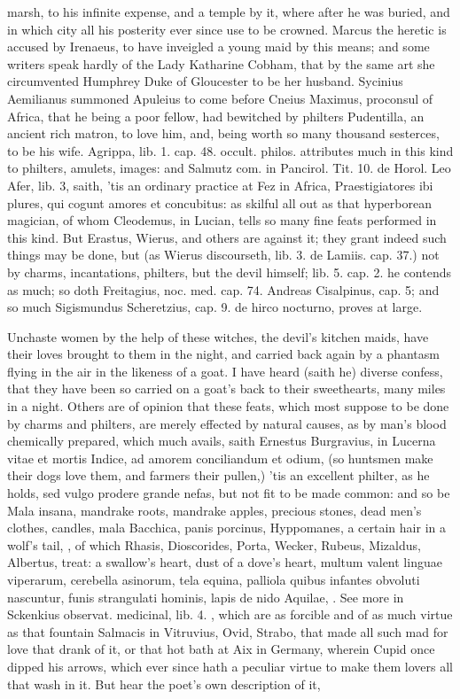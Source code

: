 {marsh, to his infinite expense, and a temple by it, where after
he was buried, and in which city all his posterity ever since use to be
crowned. Marcus the heretic is accused by Irenaeus, to have inveigled a
young maid by this means; and some writers speak hardly of the Lady
Katharine Cobham, that by the same art she circumvented Humphrey Duke
of Gloucester to be her husband. Sycinius Aemilianus summoned
Apuleius to come before Cneius Maximus, proconsul of Africa, that
he being a poor fellow, had bewitched by philters Pudentilla, an
ancient rich matron, to love him, and, being worth so many thousand
sesterces, to be his wife. Agrippa, lib. 1. cap. 48. occult. philos.
attributes much in this kind to philters, amulets, images: and Salmutz
com. in Pancirol. Tit. 10. de Horol. Leo Afer, lib. 3, saith, 'tis an
ordinary practice at Fez in Africa, Praestigiatores ibi plures, qui
cogunt amores et concubitus: as skilful all out as that hyperborean
magician, of whom Cleodemus, in  Lucian, tells so many fine feats
performed in this kind. But Erastus, Wierus, and others are against it;
they grant indeed such things may be done, but (as Wierus discourseth,
lib. 3. de Lamiis. cap. 37.) not by charms, incantations, philters, but
the devil himself; lib. 5. cap. 2. he contends as much; so doth
Freitagius, noc. med. cap. 74. Andreas Cisalpinus, cap. 5; and so much
Sigismundus Scheretzius, cap. 9. de hirco nocturno, proves at large.

Unchaste women by the help of these witches, the devil's kitchen
maids, have their loves brought to them in the night, and carried back
again by a phantasm flying in the air in the likeness of a goat. I have
heard (saith he) diverse confess, that they have been so carried on a
goat's back to their sweethearts, many miles in a night. Others are of
opinion that these feats, which most suppose to be done by charms and
philters, are merely effected by natural causes, as by man's blood
chemically prepared, which much avails, saith Ernestus Burgravius, in
Lucerna vitae et mortis Indice, ad amorem conciliandum et odium, (so
huntsmen make their dogs love them, and farmers their pullen,) 'tis an
excellent philter, as he holds, sed vulgo prodere grande nefas, but not
fit to be made common: and so be Mala insana, mandrake roots, mandrake
apples, precious stones, dead men's clothes, candles, mala
Bacchica, panis porcinus, Hyppomanes, a certain hair in a wolf's
tail, \etc{}, of which Rhasis, Dioscorides, Porta, Wecker, Rubeus,
Mizaldus, Albertus, treat: a swallow's heart, dust of a dove's heart,
multum valent linguae viperarum, cerebella asinorum, tela equina,
palliola quibus infantes obvoluti nascuntur, funis strangulati hominis,
lapis de nido Aquilae, \etc{}. See more in Sckenkius observat. medicinal,
lib. 4. \etc{}, which are as forcible and of as much virtue as that
fountain Salmacis in  Vitruvius, Ovid, Strabo, that made all such
mad for love that drank of it, or that hot bath at Aix in
Germany, wherein Cupid once dipped his arrows, which ever since hath a
peculiar virtue to make them lovers all that wash in it. But hear the
poet's own description of it,

}
